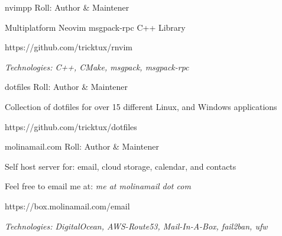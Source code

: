 

\begin{cventries}

	\cventry
		{} %
		{nvimpp} %
		{} %
		{Roll: Author \& Maintener} %
		{
			\begin{cvitems} %
				\item {Multiplatform Neovim msgpack-rpc C++ Library}
				\item {https://github.com/tricktux/rnvim}
				\item {\it{Technologies:} C++, CMake, msgpack, msgpack-rpc}
			\end{cvitems}
		}

  \cventry
		{} %
    {dotfiles} %
    {} %
		{Roll: Author \& Maintener} %
    {
      \begin{cvitems} %
				\item {Collection of dotfiles for over 15 different Linux, and Windows applications}
				\item {https://github.com/tricktux/dotfiles}
      \end{cvitems}
    }
	\cventry
		{} %
		{molinamail.com} %
		{} %
		{Roll: Author \& Maintener} %
		{
			\begin{cvitems} %
			\item {Self host server for: email, cloud storage, calendar, and contacts}
			\item {Feel free to email me at: \it{me at molinamail dot com}}
			\item {https://box.molinamail.com/email}
			\item {\it{Technologies:} DigitalOcean, AWS-Route53, Mail-In-A-Box, fail2ban, ufw }
			\end{cvitems}
		}

\end{cventries}

